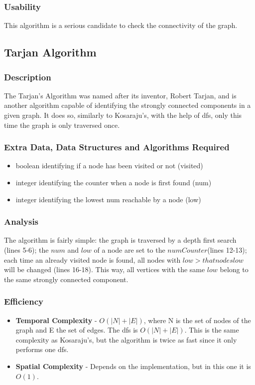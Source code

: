 \subsubsection{Usability}
This algorithm is a serious candidate to check the connectivity of the graph.


\subsection{Tarjan Algorithm}

\subsubsection{Description}
The Tarjan's Algorithm was named after its inventor, Robert Tarjan, and is another algorithm capable of identifying the strongly connected components in a given graph. It does so, similarly to Kosaraju's, with the help of dfs, only this time the graph is only traversed once.

\subsubsection{Extra Data, Data Structures and Algorithms Required}
\begin{itemize}
    \item boolean identifying if a node has been visited or not (visited)
    \item integer identifying the counter when a node is first found (num)
    \item integer identifying the lowest num reachable by a node (low)
\end{itemize}



\subsubsection{Analysis}
The algorithm is fairly simple: the graph is traversed by a depth first search (lines 5-6); the $num$ and $low$ of a node are set to the $numCounter$(lines 12-13); each time an already visited node is found, all nodes with $low > that nodes low$ will be changed (lines 16-18). This way, all vertices with the same $low$ belong to the same strongly connected component. 

\subsubsection{Efficiency}
\begin{itemize}
    \item \textbf{Temporal Complexity} - $ O(|N|+|E|) $, where N is the set of nodes of the graph and E the set of edges. The dfs is $O(|N|+|E|)$. This is the same complexity as Kosaraju's, but the algorithm is twice as fast since it only performs one dfs.
    \item \textbf{Spatial Complexity} - Depends on the implementation, but in this one it is $ O(1) $.
\end{itemize}

